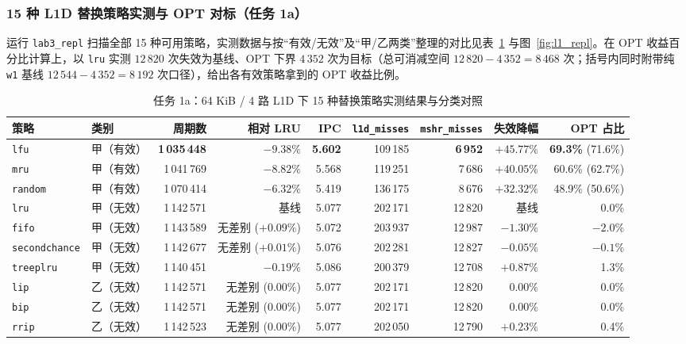 \documentclass[12pt,a4paper,fontset=mac]{ctexart}
\begin{document}
\subsubsection{15 种 L1D 替换策略实测与 OPT 对标（任务 1a）}
运行 \texttt{lab3\_repl} 扫描全部 15 种可用策略，实测数据与按“有效/无效”及“甲/乙两类”整理的对比见表~\ref{tab:t1_repl} 与图~\ref{fig:l1_repl}。在 OPT 收益百分比计算上，以 \texttt{lru} 实测 $12\,820$ 次失效为基线、OPT 下界 $4\,352$ 次为目标（总可消减空间 $12\,820 - 4\,352 = 8\,468$ 次；括号内同时附带纯 \texttt{w1} 基线 $12\,544 - 4\,352 = 8\,192$ 次口径），给出各有效策略拿到的 OPT 收益比例。

\begin{table}[H]\centering\scriptsize\setlength{\tabcolsep}{3.2pt}
\caption{任务 1a：64 KiB / 4 路 L1D 下 15 种替换策略实测结果与分类对照}\label{tab:t1_repl}
\begin{tabular}{llrrrrrrr}\toprule
策略 & 类别 & 周期数 & 相对 LRU & IPC & \texttt{l1d\_misses} & \texttt{mshr\_misses} & 失效降幅 & OPT 占比 \\\midrule
\texttt{lfu}          & 甲（有效） & \textbf{1\,035\,448} & $-9.38\%$ & \textbf{5.602} & 109\,185 & \textbf{6\,952} & $+45.77\%$ & \textbf{69.3\%} (71.6\%) \\
\texttt{mru}          & 甲（有效） & 1\,041\,769 & $-8.82\%$ & 5.568 & 119\,251 & 7\,686 & $+40.05\%$ & 60.6\% (62.7\%) \\
\texttt{random}       & 甲（有效） & 1\,070\,414 & $-6.32\%$ & 5.419 & 136\,175 & 8\,676 & $+32.32\%$ & 48.9\% (50.6\%) \\
\midrule
\texttt{lru}          & 甲（无效） & 1\,142\,571 & 基线      & 5.077 & 202\,171 & 12\,820 & 基线       & 0.0\% \\
\texttt{fifo}         & 甲（无效） & 1\,143\,589 & 无差别 ($+0.09\%$) & 5.072 & 203\,937 & 12\,987 & $-1.30\%$ & $-2.0\%$ \\
\texttt{secondchance} & 甲（无效） & 1\,142\,677 & 无差别 ($+0.01\%$) & 5.076 & 202\,281 & 12\,827 & $-0.05\%$ & $-0.1\%$ \\
\texttt{treeplru}     & 甲（无效） & 1\,140\,451 & $-0.19\%$          & 5.086 & 200\,379 & 12\,708 & $+0.87\%$ & 1.3\% \\
\midrule
\texttt{lip}          & 乙（无效） & 1\,142\,571 & 无差别 ($0.00\%$)  & 5.077 & 202\,171 & 12\,820 & $0.00\%$ & 0.0\% \\
\texttt{bip}          & 乙（无效） & 1\,142\,571 & 无差别 ($0.00\%$)  & 5.077 & 202\,171 & 12\,820 & $0.00\%$ & 0.0\% \\
\texttt{rrip}         & 乙（无效） & 1\,142\,523 & 无差别 ($0.00\%$)  & 5.077 & 202\,050 & 12\,790 & $+0.23\%$ & 0.4\% \\

\end{tabular}
\end{table}
\end{document}
